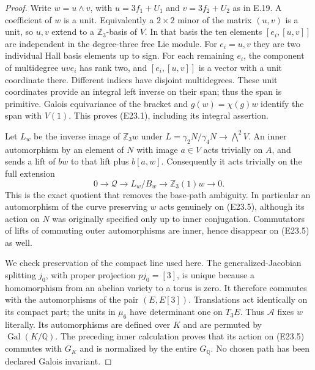 \documentclass[11pt,oneside]{article}
\begin{document}
\begin{proof}
Write $w=u\wedge v$, with
$u=3f_1+U_1$ and $v=3f_2+U_2$ as in E.19. A coefficient
of $w$ is a unit. Equivalently a $2\times2$ minor of the
matrix $(u,v)$ is a unit, so $u,v$ extend to a
$\mathbb Z_3$-basis of $V$. In that basis the ten elements
$[e_i,[u,v]]$ are independent in the degree-three free Lie
module. For $e_i=u,v$ they are two individual Hall basis
elements up to sign. For each remaining $e_i$, the component
of multidegree $u v e_i$ has rank two, and
$[e_i,[u,v]]$ is a vector with a unit coordinate there.
Different indices have disjoint multidegrees. These unit
coordinates provide an integral left inverse on their span;
thus the span is primitive. Galois equivariance of the bracket
and $g(w)=\chi(g)w$ identify the span with $V(1)$.
This proves (E23.1), including its integral assertion.

Let $L_w$ be the inverse image of $\mathbb Z_3w$ under
$L=\gamma_2N/\gamma_4N\to\bigwedge^2V$.
An inner automorphism by an element of $N$ with image
$a\in V$ acts trivially on $A$, and sends a lift of
$b w$ to that lift plus $b[a,w]$. Consequently it acts
trivially on the full extension
\[
 0\longrightarrow\mathcal Q\longrightarrow
 L_w/B_w\longrightarrow\mathbb Z_3(1)w
             \longrightarrow0.
 \tag{E23.5}
\]
This is the exact quotient that removes the base-path
ambiguity. In particular an automorphism of the curve
preserving $w$ acts genuinely on (E23.5), although its
action on $N$ was originally specified only up to inner
conjugation. Commutators of lifts of commuting outer
automorphisms are inner, hence disappear on (E23.5) as well.

We check preservation of the compact line used here.
The generalized-Jacobian splitting $j_0$, with proper
projection $p j_0=[3]$, is unique because a homomorphism
from an abelian variety to a torus is zero. It therefore
commutes with the automorphisms of the pair $(E,E[3])$.
Translations act identically on its compact part; the
units in $\mu_6$ have determinant one on $T_3E$.
Thus $\mathcal A$ fixes $w$ literally. Its automorphisms
are defined over $K$ and are permuted by
$\operatorname{Gal}(K/\mathbb Q)$. The preceding inner
calculation proves that its action on (E23.5) commutes
with $G_K$ and is normalized by the entire $G_{\mathbb Q}$.
No chosen path has been declared Galois invariant.


\end{proof}
\end{document}
